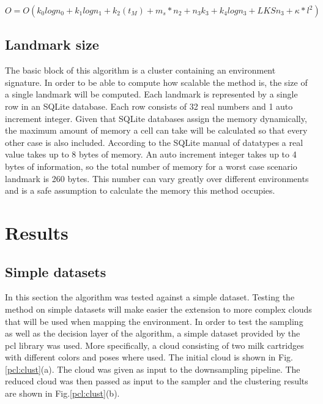\documentclass[]{article}
\begin{document}
    \begin{equation} \label{Complexity}
        O= O(k_{0}logn_{0} + k_{1}logn_{1} + k_{2}(t_M)+ m_s*n_{2} + n_{3}k_{3} + k_{4}logn_{3} + LKSn_3 + \kappa * l^2)
    \end{equation}

    \subsection{Landmark size}

    The basic block of this algorithm is a cluster containing an environment signature. In order to be able to compute how scalable the method is, the size of a single landmark will be computed. Each landmark is represented by a single row in an SQLite database. Each row consists of 32 real numbers and 1 auto increment integer. Given that SQLite databases assign the memory dynamically, the maximum amount of memory a cell can take will be calculated so that every other case is also included. According to the SQLite manual of datatypes a real value takes up to 8 bytes of memory. An auto increment integer takes up to 4 bytes of information, so the total number  of memory for a worst case scenario landmark is 260 bytes. This number can vary greatly over different environments and is a safe assumption to calculate the memory this method occupies.

    \section{Results}
    \label{sec:results}

    \subsection{Simple datasets}

    In this section the algorithm was tested against a simple dataset. Testing the method on simple datasets will make easier the extension to more complex clouds that will be used when mapping the environment. In order to test the sampling as well as the decision layer of the algorithm, a simple dataset provided by the pcl\cite{pcl} library was used. More specifically, a cloud consisting of two milk cartridges with different colors and poses where used. The initial cloud is shown in Fig.\ref{pcl:clust}(a). The cloud was given as input to the downsampling pipeline. The reduced cloud was then passed as input to the sampler and the clustering results are shown in Fig.\ref{pcl:clust}(b).
\end{document}
